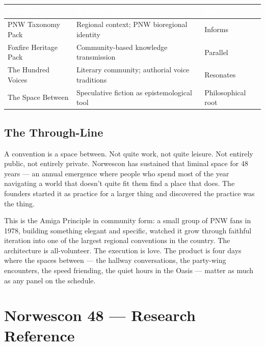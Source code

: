 \documentclass[11pt,letterpaper]{article}
\newcommand{\stageheader}[2]{%
  \noindent\colorbox{#2}{\makebox[\textwidth][l]{%
    \textcolor{white}{\bfseries\sffamily\hspace{6pt}#1\hspace{6pt}}}}%
  \vspace{0.5em}\par%
}
\newcommand{\tableheader}[1]{\textbf{\sffamily\textcolor{white}{#1}}}
\begin{document}
\begin{center}
\begin{tabularx}{\textwidth}{L{4cm}XL{2.5cm}}
\toprule
{}
\tableheader{Document} & \tableheader{Relationship} & \tableheader{Direction} \\
\midrule
PNW Taxonomy Pack & Regional context; PNW bioregional identity & Informs \\
Foxfire Heritage Pack & Community-based knowledge transmission & Parallel \\
The Hundred Voices & Literary community; authorial voice traditions & Resonates \\
The Space Between & Speculative fiction as epistemological tool & Philosophical root \\
\bottomrule
\end{tabularx}
\end{center}

\subsection{The Through-Line}

A convention is a space between. Not quite work, not quite leisure. Not entirely public, not entirely private. Norwescon has sustained that liminal space for 48 years --- an annual emergence where people who spend most of the year navigating a world that doesn't quite fit them find a place that does. The founders started it as practice for a larger thing and discovered the practice was the thing.

This is the Amiga Principle in community form: a small group of PNW fans in 1978, building something elegant and specific, watched it grow through faithful iteration into one of the largest regional conventions in the country. The architecture is all-volunteer. The execution is love. The product is four days where the spaces between --- the hallway conversations, the party-wing encounters, the speed friending, the quiet hours in the Oasis --- matter as much as any panel on the schedule.

\newpage
\stageheader{STAGE 2 --- RESEARCH REFERENCE}{secondary}

\section{Norwescon 48 --- Research Reference}
\end{document}
